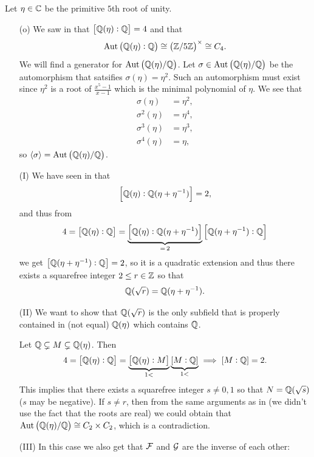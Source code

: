 \documentclass[11pt,a4paper]{article}
\begin{document}
\begin{example}
  \label{exmp:galois-eta}
  Let $\eta \in \mathbb{C}$ be the primitive $5$th root of unity.
  \begin{enumerate}
    \item[(o)]
  We saw in  that $\left[\mathbb{Q}(\eta) : \mathbb{Q}\right] = 4$
  and that
  \[
    \Aut\del{\Q(\eta) : \Q} \cong \del{\Z/5\Z}^{\times} \cong C_4.
  \]
  We will find a generator for $\Aut\del{\Q(\eta)/\Q}$.
  Let $\sigma \in \Aut\del{\Q(\eta) / \Q}$ be the automorphism that satsifies
  $\sigma(\eta) = \eta^2$.
  Such an automorphism must exist since $\eta^2$
  is a root of $\frac{x^5 - 1}{x - 1}$
  which is the minimal polynomial of $\eta$.
  We see that
  \begin{align*}
    \sigma(\eta) &= \eta^2, \\
    \sigma^2(\eta) &= \eta^4, \\
    \sigma^3(\eta) &= \eta^3, \\
    \sigma^4(\eta) &= \eta,
  \end{align*}
  so $\langle \sigma \rangle = \Aut\del{\Q(\eta) / \Q}$.
    \item[(I)]
      We have seen in  that
      \[
        \left[\mathbb{Q}(\eta) : \mathbb{Q}(\eta + \eta^{-1})\right] = 2,
      \]
      and thus from
      \[
        4 = \left[\mathbb{Q}(\eta) : \mathbb{Q}\right] =
        \underbrace{\left[\mathbb{Q}(\eta) : \mathbb{Q}(\eta + \eta^{-1})\right]}_{=\,2}
        \left[\mathbb{Q}(\eta + \eta^{-1}) : \mathbb{Q}\right]
      \]
      we get $\left[\mathbb{Q}(\eta + \eta^{-1}) : \mathbb{Q}\right] = 2$,
      so it is a quadratic extension and thus
      there exists a squarefree integer $2 \le r \in \mathbb{Z}$
      so that
      \[
        \mathbb{Q}(\sqrt r) = \mathbb{Q}(\eta + \eta^{-1}).
      \]
    \item[(II)]
      We want to show that $\mathbb{Q}(\sqrt r)$ is the only subfield that is
      properly contained in (not equal) $\mathbb{Q}(\eta)$ which contains $\mathbb{Q}$.

      Let $\mathbb{Q} \subsetneq M \subsetneq \mathbb{Q}(\eta)$.
      Then
      \[
        4 = \left[\mathbb{Q}(\eta) : \mathbb{Q}\right] =
        \underbrace{\left[\mathbb{Q}(\eta) : M\right]}_{1 <}
        \underbrace{\left[M : \mathbb{Q}\right]}_{1 <} \implies
        \left[M : \mathbb{Q}\right] = 2.
      \]
      This implies that there exists a squarefree integer $s \neq 0,1$
      so that $N = \mathbb{Q}(\sqrt s)$ ($s$ may be negative).
      If $s \neq r$, then from the same arguments as in
       (we didn't use
      the fact that the roots are real)
      we could obtain that $\Aut\del{\Q(\eta) / \Q} \cong C_2 \times C_2$,
      which is a contradiction.
    \item[(III)] In this case we also get
      that $\mathcal F$ and $\mathcal G$ are the inverse of each other:
      \begin{center}
          \begin{tikzpicture}[
            node distance=0.8cm and 0.4cm,
            every node/.style={inner sep=1pt},
            field/.style={},
            group/.style={},
            correspondence/.style={dashed, <->},
            scale=0.8
          ]


\end{tikzpicture}
\end{center}
\end{enumerate}
\end{example}
\end{document}
